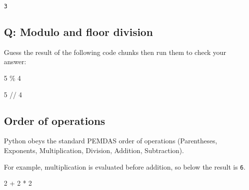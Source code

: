 \documentclass[
  letterpaper,
  DIV=11,
  numbers=noendperiod]{scrreprt}
\newenvironment{Shaded}{\begin{snugshade}}{\end{snugshade}}
\newcommand{\DecValTok}[1]{\textcolor[rgb]{0.68,0.00,0.00}{#1}}
\newcommand{\OperatorTok}[1]{\textcolor[rgb]{0.37,0.37,0.37}{#1}}
\begin{document}
\begin{verbatim}
3
\end{verbatim}

\begin{tcolorbox}[enhanced jigsaw, colframe=quarto-callout-tip-color-frame, opacityback=0, titlerule=0mm, bottomrule=.15mm, breakable, leftrule=.75mm, colbacktitle=quarto-callout-tip-color!10!white, title=\textcolor{quarto-callout-tip-color}{\faLightbulb}\hspace{0.5em}{Practice}, rightrule=.15mm, coltitle=black, opacitybacktitle=0.6, colback=white, left=2mm, arc=.35mm, toptitle=1mm, bottomtitle=1mm, toprule=.15mm]

\subsection{Q: Modulo and floor
division}\label{q-modulo-and-floor-division}

Guess the result of the following code chunks then run them to check
your answer:

\begin{Shaded}
\begin{Highlighting}[]
\DecValTok{5} \OperatorTok{\%} \DecValTok{4}
\end{Highlighting}
\end{Shaded}

\begin{Shaded}
\begin{Highlighting}[]
\DecValTok{5} \OperatorTok{//} \DecValTok{4}
\end{Highlighting}
\end{Shaded}

\end{tcolorbox}

\subsection{Order of operations}\label{order-of-operations}

Python obeys the standard PEMDAS order of operations (Parentheses,
Exponents, Multiplication, Division, Addition, Subtraction).

For example, multiplication is evaluated before addition, so below the
result is \texttt{6}.

\begin{Shaded}
\begin{Highlighting}[]
\DecValTok{2} \OperatorTok{+} \DecValTok{2} \OperatorTok{*} \DecValTok{2}   
\end{Highlighting}
\end{Shaded}
\end{document}
